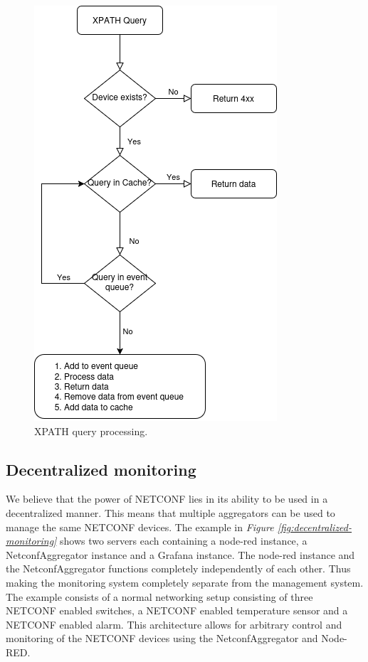\documentclass[12pt]{article}
\begin{document}
\begin{figure}
  \centering
  \includegraphics{xpathquery.drawio.png}
  \caption{XPATH query processing.}
  \label{fig:xpath-query}
\end{figure}

\newpage

\subsection{Decentralized monitoring}
We believe that the power of NETCONF lies in its ability to be used in a decentralized manner.
This means that multiple aggregators can be used to manage the same NETCONF devices. 
The example in \textit{Figure \ref{fig:decentralized-monitoring}} shows two servers each containing a node-red instance, a NetconfAggregator 
instance and a Grafana instance. The node-red instance and the NetconfAggregator functions completely independently of each other.
Thus making the monitoring system completely separate from the management system. The example consists of a normal networking setup
consisting of three NETCONF enabled switches, a NETCONF enabled temperature sensor and a NETCONF enabled alarm.
This architecture allows for arbitrary control and monitoring of the NETCONF devices using the NetconfAggregator and Node-RED.
\end{document}

